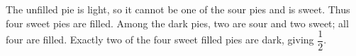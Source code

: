 The unfilled pie is light, so it cannot be one of the sour pies and is sweet. Thus four sweet pies are filled. Among the dark pies, two are sour and two sweet; all four are filled. Exactly two of the four sweet filled pies are dark, giving $\boxed{\dfrac{1}{2}}$.
